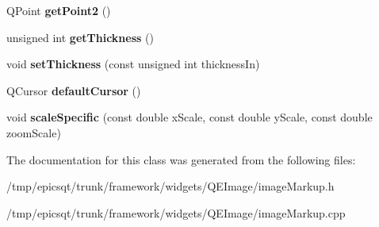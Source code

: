\begin{DoxyCompactItemize}
\item 
\hypertarget{classmarkupText_aadcefe65b8d559e50d3ce7c3111b8ee0}{
QPoint {\bfseries getPoint2} ()}
\label{classmarkupText_aadcefe65b8d559e50d3ce7c3111b8ee0}

\item 
\hypertarget{classmarkupText_a927a0d805ff4c8161db72d645f4c0189}{
unsigned int {\bfseries getThickness} ()}
\label{classmarkupText_a927a0d805ff4c8161db72d645f4c0189}

\item 
\hypertarget{classmarkupText_a0dac42dcf535cbb3789d1d85c0533154}{
void {\bfseries setThickness} (const unsigned int thicknessIn)}
\label{classmarkupText_a0dac42dcf535cbb3789d1d85c0533154}

\item 
\hypertarget{classmarkupText_aaac3cc8458c9d760fe671d8bd8e06fc1}{
QCursor {\bfseries defaultCursor} ()}
\label{classmarkupText_aaac3cc8458c9d760fe671d8bd8e06fc1}

\item 
\hypertarget{classmarkupText_aa6ce0350b7e119353e35d1bf865b3741}{
void {\bfseries scaleSpecific} (const double xScale, const double yScale, const double zoomScale)}
\label{classmarkupText_aa6ce0350b7e119353e35d1bf865b3741}

\end{DoxyCompactItemize}


The documentation for this class was generated from the following files:\begin{DoxyCompactItemize}
\item 
/tmp/epicsqt/trunk/framework/widgets/QEImage/imageMarkup.h\item 
/tmp/epicsqt/trunk/framework/widgets/QEImage/imageMarkup.cpp\end{DoxyCompactItemize}
